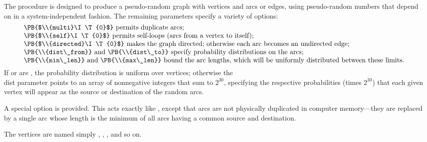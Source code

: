 The procedure 
is designed to produce a pseudo-random graph with
 vertices and  arcs or edges, using pseudo-random numbers that
depend on  in a system-independent fashion. The remaining
parameters
specify a variety of options:
$$\vcenter{\halign{#\hfil\cr
\PB{$\\{multi}\I\T{0}$} permits duplicate arcs;\cr
\PB{$\\{self}\I\T{0}$} permits self-loops (arcs from a vertex to itself);\cr
\PB{$\\{directed}\I\T{0}$} makes the graph directed; otherwise each arc becomes
an undirected edge;\cr
\PB{\\{dist\_from}} and \PB{\\{dist\_to}} specify probability distributions on
the arcs;\cr
\PB{\\{min\_len}} and \PB{\\{max\_len}} bound the arc lengths, which will be
uniformly
distributed between these limits.\cr
}}$$
If  or  are \PB{$\NULL$}, the probability
distribution is
uniform over vertices; otherwise the \\{dist} parameter points to an array of
 nonnegative integers that sum to $2^{30}$, specifying the respective
probabilities (times $2^{30}$) that each given vertex will appear as the
source or destination of the random arcs.

A special option  is provided. This acts exactly like
, except that arcs are not physically duplicated in
computer
memory---they are replaced by a single arc whose length is the minimum
of all arcs having a common source and destination.

The vertices are named simply , , , and so
on.

